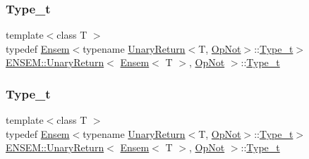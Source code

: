 \subsubsection{\texorpdfstring{Type\_t}{Type\_t}\hspace{0.1cm}{\footnotesize\ttfamily [1/3]}}
{\footnotesize\ttfamily template$<$class T $>$ \\
typedef \mbox{\hyperlink{classENSEM_1_1Ensem}{Ensem}}$<$typename \mbox{\hyperlink{structENSEM_1_1UnaryReturn}{Unary\+Return}}$<$T, \mbox{\hyperlink{structENSEM_1_1OpNot}{Op\+Not}}$>$\+::\mbox{\hyperlink{structENSEM_1_1UnaryReturn_3_01Ensem_3_01T_01_4_00_01OpNot_01_4_a858a31d9b2f5ae17601e7f83f0a58f5a}{Type\+\_\+t}}$>$ \mbox{\hyperlink{structENSEM_1_1UnaryReturn}{E\+N\+S\+E\+M\+::\+Unary\+Return}}$<$ \mbox{\hyperlink{classENSEM_1_1Ensem}{Ensem}}$<$ T $>$, \mbox{\hyperlink{structENSEM_1_1OpNot}{Op\+Not}} $>$\+::\mbox{\hyperlink{structENSEM_1_1UnaryReturn_3_01Ensem_3_01T_01_4_00_01OpNot_01_4_a858a31d9b2f5ae17601e7f83f0a58f5a}{Type\+\_\+t}}}

\mbox{\label{structENSEM_1_1UnaryReturn_3_01Ensem_3_01T_01_4_00_01OpNot_01_4_a858a31d9b2f5ae17601e7f83f0a58f5a}} 
\subsubsection{\texorpdfstring{Type\_t}{Type\_t}\hspace{0.1cm}{\footnotesize\ttfamily [2/3]}}
{\footnotesize\ttfamily template$<$class T $>$ \\
typedef \mbox{\hyperlink{classENSEM_1_1Ensem}{Ensem}}$<$typename \mbox{\hyperlink{structENSEM_1_1UnaryReturn}{Unary\+Return}}$<$T, \mbox{\hyperlink{structENSEM_1_1OpNot}{Op\+Not}}$>$\+::\mbox{\hyperlink{structENSEM_1_1UnaryReturn_3_01Ensem_3_01T_01_4_00_01OpNot_01_4_a858a31d9b2f5ae17601e7f83f0a58f5a}{Type\+\_\+t}}$>$ \mbox{\hyperlink{structENSEM_1_1UnaryReturn}{E\+N\+S\+E\+M\+::\+Unary\+Return}}$<$ \mbox{\hyperlink{classENSEM_1_1Ensem}{Ensem}}$<$ T $>$, \mbox{\hyperlink{structENSEM_1_1OpNot}{Op\+Not}} $>$\+::\mbox{\hyperlink{structENSEM_1_1UnaryReturn_3_01Ensem_3_01T_01_4_00_01OpNot_01_4_a858a31d9b2f5ae17601e7f83f0a58f5a}{Type\+\_\+t}}}

